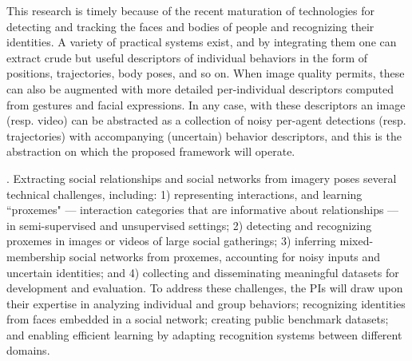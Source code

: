 This research is timely because of the recent maturation of technologies for detecting and tracking the faces and bodies of people and recognizing their identities. A variety of practical systems exist, and by integrating them one can extract crude but useful descriptors of individual behaviors in the form of positions, trajectories, body poses, and so on. When image quality permits, these can also be augmented with more detailed per-individual descriptors computed from gestures  and facial expressions. In any case, with these descriptors an image (resp. video) can be abstracted as a collection of noisy per-agent detections (resp. trajectories) with accompanying (uncertain) behavior descriptors, and this is the abstraction on which the proposed framework will operate.

. Extracting social relationships and social networks from imagery poses several technical challenges, including: 1) representing interactions, and learning ``proxemes" --- interaction categories that are informative about relationships --- in semi-supervised and unsupervised settings; 2) detecting and recognizing proxemes in images or videos of large social gatherings; 3) inferring mixed-membership social networks from proxemes, accounting for noisy inputs and uncertain identities; and 4) collecting and disseminating meaningful datasets for development and evaluation. To address these challenges, the PIs will draw upon their expertise in analyzing individual and group behaviors; recognizing identities from faces embedded in a social network; creating public benchmark datasets; and enabling efficient learning by adapting recognition systems between different domains.



